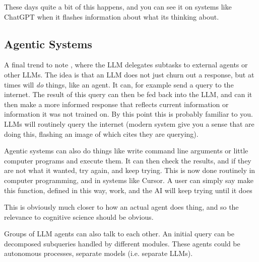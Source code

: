 
These days quite a bit of this happens, and you can see it on systems like ChatGPT when it flashes information about what its thinking about.
 

\subsection{Agentic Systems}


A final trend to note , where the LLM delegates subtasks to external agents or other LLMs. The idea is that an LLM does not just churn out a response, but at times will \emph{do} things, like an agent. It can, for example send a query to the internet. The result of this query can then be fed back into the LLM, and can it then make a more informed response that reflects current information or information it was not trained on. By this point this is probably familiar to you.  LLMs will routinely query the internet (modern system give you a sense that are doing this, flashing an image of which cites they are querying).  

Agentic systems can also do things like write command line arguments or little computer programs and execute them. It can then check the results, and if they are not what it wanted, try again, and keep trying. This is now done routinely in computer programming, and in systems like Cursor.  A user can simply say make this function, defined in this way, work, and the AI will keep trying until it does

This is obviously much closer to how an actual agent does thing, and so the relevance to cognitive science should be obvious.

Groups of LLM agents can also talk to each other.  An initial query can be decomposed  subqueries handled by different modules. These agents could be autonomous processes, separate models (i.e. separate LLMs).

